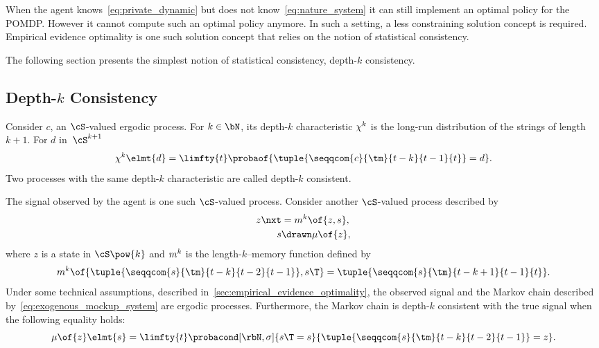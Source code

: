 When the agent knows~\cref{eq:private_dynamic} but does not know~\cref{eq:nature_system} it can still implement an optimal policy for the POMDP.
However it cannot compute such an optimal policy anymore.
In such a setting, a less constraining solution concept is required.
Empirical evidence optimality is one such solution concept that relies on the notion of statistical consistency.

The following section presents the simplest notion of statistical consistency, depth-\(k\) consistency.

\subsection{Depth-\(k\) Consistency}
\label{sec:depth-k_consistency}

Consider \(c\), an \(\cS\)-valued ergodic process.
For \(k \in \bN\), its depth-\(k\) characteristic \(\chi^k\) is the long-run distribution of the strings of length \(k + 1\).
For \(d\) in~\(\cS^{k + 1}\)
\begin{equation}
\label{eq:depth-k_characteristic}
\chi\K\elmt{d} = \limfty{t} \probaof{\tuple{\seqqcom{c}{\tm}{t - k}{t - 1}{t}} = d}.
\end{equation}
Two processes with the same depth-\(k\) characteristic are called depth-\(k\) consistent.

The signal observed by the agent is one such \(\cS\)-valued process.
Consider another \(\cS\)-valued process described by
\begin{subequations}
\label{eq:exogenous_mockup_system}
\begin{align}
\label{eq:exogenous_mockup_model}
z\nxt &= m\K \of{z, s}, \\
\label{eq:exogenous_mockup_predictor}
s &\drawn \mu \of{z},
\end{align}
\end{subequations}
where \(z\) is a state in \(\cS\pow{k}\) and \(m^k\) is the length-\(k\)--memory function defined by
\[
m\K \of{\tuple{\seqqcom{s}{\tm}{t - k}{t - 2}{t - 1}}, s\T} = \tuple{\seqqcom{s}{\tm}{t - k + 1}{t - 1}{t}}.
\]
Under some technical assumptions, described in~\cref{sec:empirical_evidence_optimality}, the observed signal and the Markov chain described by~\cref{eq:exogenous_mockup_system} are ergodic processes.
Furthermore, the Markov chain is depth-\(k\) consistent with the true signal when the following equality holds:
\[
\mu \of{z} \elmt{s} = \limfty{t}\probacond[\rbN, \sigma]{s\T = s}{\tuple{\seqqcom{s}{\tm}{t - k}{t - 2}{t - 1}} = z}.
\]

